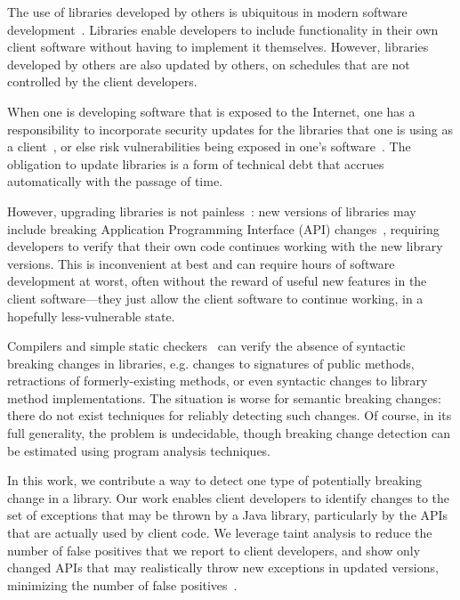 The use of libraries developed by others is ubiquitous in modern
software development~\cite{huang22:_charac_java,wang20:_java}. Libraries enable developers to include
functionality in their own client software without having to
implement it themselves.  However, libraries developed by others are
also updated by others, on schedules that are not controlled by the client developers.

When one is developing software that is exposed to the Internet, one
has a responsibility to incorporate security updates for the
libraries that one is using as a client~\cite{wu23:_under_threat_upstr_vulner_downs}, or else risk vulnerabilities
being exposed in one's software~\cite{haryono22:_autom_ident_librar_vulner_data,zhan21:_atvhun,alfadel23:_empir_python}. The obligation to update libraries is
a form of technical debt that accrues automatically with the passage
of time.

However, upgrading libraries is not painless~\cite{elizalde18:_towar_smoot_librar_migrat,derr17:_keep,dann23:_upcy}: new
versions of libraries may include breaking Application Programming
Interface (API) changes~\cite{dietrich14:_broken}, requiring developers to verify that their own
code continues working with the new library versions. This is
inconvenient at best and can require hours of software development at worst,
often without the reward of useful new features in the client software---they
just allow the client software to continue working, in a hopefully less-vulnerable
state.

Compilers and simple static
checkers~\cite{brito18:_apidif,foo18:_effic_static_check_librar_updat}
can verify the absence of syntactic breaking changes in libraries,
e.g. changes to signatures of public methods, retractions of
formerly-existing methods, or even syntactic changes to library method
implementations. The situation is worse for semantic breaking changes:
there do not exist techniques for reliably detecting such changes. Of
course, in its full generality, the problem is undecidable, though
breaking change detection can be estimated using program analysis
techniques.


In this work, we contribute a way to detect one type of potentially breaking
change in a library. Our work enables client developers to identify changes
to the set of exceptions that may be thrown by a Java library, particularly
by the APIs that are actually used by client code. We leverage taint analysis
to reduce the number of false positives that we report to client developers,
and show only changed APIs that may realistically throw new exceptions
in updated versions, minimizing the number of false positives~\cite{pashchenko20:_vuln4,pashchenko18:_vulner}. %

